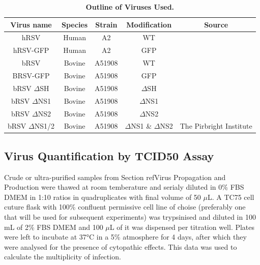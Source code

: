 \begin{table}
\centering
\begin{tabular}{ccccc}
\hline
{\textbf{Virus name}} &
  {\textbf{Species}} &
  { \textbf{Strain}} &
  { \textbf{Modification}} &
  { \textbf{Source}} \\ \hline
hRSV      & Human  & A2     & WT   &  \\ \cline{1-4}
hRSV-GFP  & Human  & A2     & GFP  &  \\ \cline{1-4}
bRSV      & Bovine & A51908 & WT   &  \\ \cline{1-4}
BRSV-GFP  & Bovine & A51908 & GFP  &  \\ \cline{1-4}
bRSV \(\Delta\)SH  & Bovine & A51908 & \(\Delta\)SH  &  \\ \cline{1-4}
bRSV \(\Delta\)NS1 & Bovine & A51908 & \(\Delta\)NS1 &  \\ \cline{1-4}
bRSV \(\Delta\)NS2 & Bovine & A51908 & \(\Delta\)NS2 &  \\ \cline{1-4}
bRSV \(\Delta\)NS1/2 &
  Bovine &
  A51908 &
  \(\Delta\)NS1 \& \(\Delta\)NS2 &
  \multirow{-8}{*}{The Pirbright Institute} \\ \hline
\end{tabular}
\caption[Outline of Viruses Used.]{\textbf{Outline of Viruses Used.}}
\label{Outline of Viruses Used table}
\end{table}




\subsection{Virus Quantification by TCID50 Assay} \label{Virus Quantification by TCID50 Assay}
Crude or ultra-purified samples from Section ref{Virus Propagation and Production} were thawed at room temberature and serialy diluted in 0\% FBS DMEM in 1:10 ratios in quadruplicates with final volume of 50 \(\mu\)L. A TC75 cell cuture flask with 100\% confluent permissive cell line of choise (preferably one that will be used for subsequent experiments) was trypsinised and diluted in 100 mL of 2\% FBS DMEM and 100 \(\mu\)L of it was dispensed per titration well. Plates were left to incubate at 37°C in a 5\%  atmosphere for 4 days, after which they were analysed for the presence of cytopathic effects. This data was used to calculate the multiplicity of infection.




